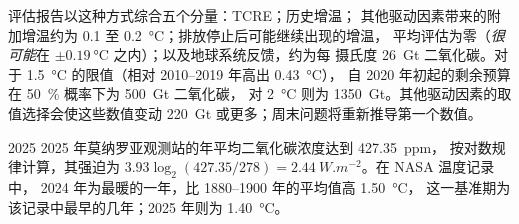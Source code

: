 评估报告以这种方式综合五个分量：TCRE；历史增温；
其他驱动因素带来的附加增温约为 0.1 至 \qty{0.2}{\celsius}；排放停止后可能继续出现的增温，
平均评估为零（\emph{很可能}在 $\pm
\qty{0.19}{\celsius}$ 之内）；以及地球系统反馈，约为每
摄氏度 \qty{26}{Gt} 二氧化碳。对于 \qty{1.5}{\celsius} 的限值（相对 2010--2019 年高出 \qty{0.43}{\celsius}），
自 2020 年初起的剩余预算在 \qty{50}{\percent} 概率下为 \qty{500}{Gt} 二氧化碳，
对 \qty{2}{\celsius} 则为 \qty{1350}{Gt}。其他驱动因素的取值选择会使这些数值变动
\qty{220}{Gt} 或更多；周末问题将重新推导第一个数值。

\begin{dated}{2025}
2025 年莫纳罗亚观测站的年平均二氧化碳浓度达到 \qty{427.35}{ppm}，
按对数规律计算，其强迫为 $3.93\log_2(427.35/278) = \qty{2.44}{W.m^{-2}}$。在 NASA 温度记录中，
2024 年为最暖的一年，比 1880--1900 年的平均值高 \qty{1.50}{\celsius}，
这一基准期为该记录中最早的几年；2025 年则为 \qty{1.40}{\celsius}。
\end{dated}

